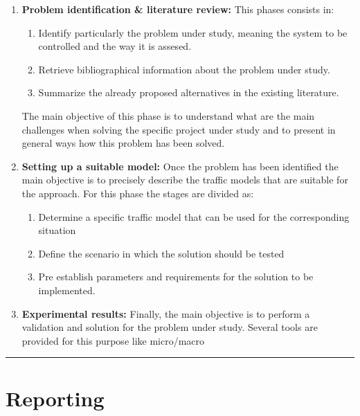 \documentclass[]{book}
\providecommand{\tightlist}{%
  \setlength{\itemsep}{0pt}\setlength{\parskip}{0pt}}
\theoremstyle{definition}
\theoremstyle{definition}
\theoremstyle{definition}
\theoremstyle{remark}
\begin{document}
\begin{enumerate}
\def\labelenumi{\arabic{enumi}.}
\item
  \textbf{Problem identification \& literature review:} This phases
  consists in:

  \begin{enumerate}
  \def\labelenumii{\arabic{enumii}.}
  \item
    Identify particularly the problem under study, meaning the system to
    be controlled and the way it is assesed.
  \item
    Retrieve bibliographical information about the problem under study.
  \item
    Summarize the already proposed alternatives in the existing
    literature.
  \end{enumerate}

  The main objective of this phase is to understand what are the main
  challenges when solving the specific project under study and to
  present in general ways how this problem has been solved.
\item
  \textbf{Setting up a suitable model:} Once the problem has been
  identified the main objective is to precisely describe the traffic
  models that are suitable for the approach. For this phase the stages
  are divided as:

  \begin{enumerate}
  \def\labelenumii{\arabic{enumii}.}
  \tightlist
  \item
    Determine a specific traffic model that can be used for the
    corresponding situation
  \item
    Define the scenario in which the solution should be tested
  \item
    Pre establish parameters and requirements for the solution to be
    implemented.
  \end{enumerate}
\item
  \textbf{Experimental results:} Finally, the main objective is to
  perform a validation and solution for the problem under study. Several
  tools are provided for this purpose like micro/macro
\end{enumerate}

\begin{center}\rule{0.5\linewidth}{\linethickness}\end{center}

\hypertarget{reporting}{%
\section*{Reporting}\label{reporting}}
\end{document}
